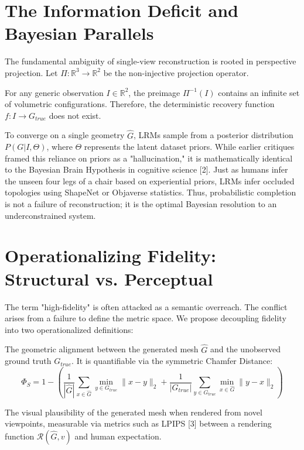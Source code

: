 \documentclass[10pt,journal,compsoc]{IEEEtran}
\begin{document}
\section{The Information Deficit and Bayesian Parallels}
The fundamental ambiguity of single-view reconstruction is rooted in perspective projection. Let $\Pi: \mathbb{R}^3 \to \mathbb{R}^2$ be the non-injective projection operator. 

\begin{theorem}
For any generic observation $I \in \mathbb{R}^2$, the preimage $\Pi^{-1}(I)$ contains an infinite set of volumetric configurations. Therefore, the deterministic recovery function $f: I \to G_{true}$ does not exist.
\end{theorem}

To converge on a single geometry $\hat{G}$, LRMs sample from a posterior distribution $P(G | I, \Theta)$, where $\Theta$ represents the latent dataset priors. While earlier critiques framed this reliance on priors as a "hallucination," it is mathematically identical to the Bayesian Brain Hypothesis in cognitive science [2]. Just as humans infer the unseen four legs of a chair based on experiential priors, LRMs infer occluded topologies using ShapeNet or Objaverse statistics. Thus, probabilistic completion is not a failure of reconstruction; it is the optimal Bayesian resolution to an underconstrained system.

\section{Operationalizing Fidelity: Structural vs. Perceptual}
The term "high-fidelity" is often attacked as a semantic overreach. The conflict arises from a failure to define the metric space. We propose decoupling fidelity into two operationalized definitions:

\begin{definition}
The geometric alignment between the generated mesh $\hat{G}$ and the unobserved ground truth $G_{true}$. It is quantifiable via the symmetric Chamfer Distance:
\[ \Phi_S = 1 - \left( \frac{1}{|\hat{G}|} \sum_{x \in \hat{G}} \min_{y \in G_{true}} \|x-y\|_2 + \frac{1}{|G_{true}|} \sum_{y \in G_{true}} \min_{x \in \hat{G}} \|y-x\|_2 \right) \]
\end{definition}

\begin{definition}
The visual plausibility of the generated mesh when rendered from novel viewpoints, measurable via metrics such as LPIPS [3] between a rendering function $\mathcal{R}(\hat{G}, v)$ and human expectation.
\end{definition}
\end{document}

